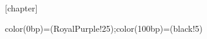 % 
  [chapter] %
  \renewcommand{\theexercise}{\thechapter.\arabic{exercise}}
% 
% 
% 
  \newcommand{\ulinedbl}[1]{%
    \underline{\underline{\textrm{ #1 }}} 
  }


  \renewcommand{\theequation}{\thechapter.\arabic{equation}}

  {color(0bp)=(RoyalPurple!25);color(100bp)=(black!5)}


